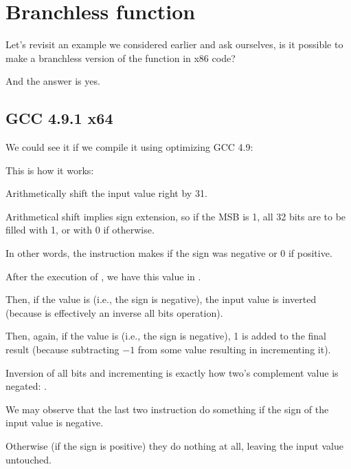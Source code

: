 \section{Branchless  function}
\label{chap:branchless_abs}

Let's revisit an example we considered earlier  and ask ourselves, is it possible
to make a branchless version of the function in x86 code?



And the answer is yes.

\subsection{\Optimizing GCC 4.9.1 x64}

We could see it if we compile it using optimizing GCC 4.9:



This is how it works:

Arithmetically shift the input value right by 31.

Arithmetical shift implies sign extension, so if the \ac{MSB} is 1, 
all 32 bits are to be filled with 1, or with 0 if otherwise.

In other words, the  instruction makes  if the sign was negative or 0 if positive.

After the execution of , we have this value in \EDX.

Then, if the value is  (i.e., the sign is negative), the input value is inverted \\
(because  is effectively an inverse all bits operation).

Then, again, if the value is  (i.e., the sign is negative), 1 is added to the final result (because
subtracting $-1$ from some value resulting in incrementing it).

Inversion of all bits and incrementing is exactly how two's complement value is negated: 
.

We may observe that the last two instruction do something if the sign of the input value is negative.

Otherwise (if the sign is positive) they do nothing at all, leaving the input value untouched.

